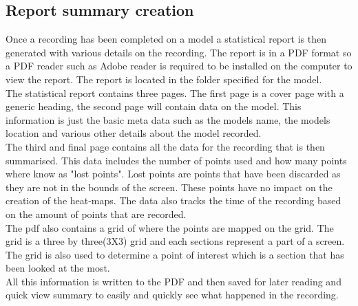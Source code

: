 \subsection{Report summary creation}
Once a recording has been completed on a model a statistical report is then generated with various details on the recording. The report is in a PDF format so a PDF reader such as Adobe reader is required to be installed on the computer to view the report. The report is located in the folder specified for the model.\\
The statistical report contains three pages. The first page is a cover page with a generic heading, the second page will contain data on the model. This information is just the basic meta data such as the models name, the models location and various other details about the model recorded.\\
The third and final page contains all the data for the recording that is then summarised. This data includes the number of points used and how many points where know as "lost points". Lost points are points that have been discarded as they are not in the bounds of the screen. These points have no impact on the creation of the heat-maps. The data also tracks the time of the recording based on the amount of points that are recorded.\\
The pdf also contains a grid of where the points are mapped on the grid. The grid is a three by three(3X3) grid and each sections represent a part of a screen. The grid is also used to determine a point of interest which is a section that has been looked at the most.\\
All this information is written to the PDF and then saved for later reading and quick view summary to easily and quickly see what happened in the recording. \\
